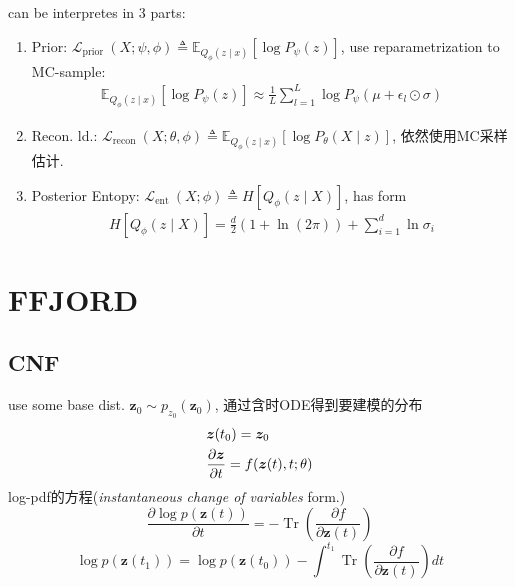 \documentclass{article}
\begin{document}
    can be interpretes in 3 parts:
    \begin{enumerate}
        \item Prior: $\mathcal{L}_{\text {prior }}(X ; \psi, \phi) \triangleq \mathbb{E}_{Q_{\phi}(z \mid x)}\left[\log P_{\psi}(z)\right]$, use reparametrization to MC-sample: \begin{align}
            \mathbb{E}_{Q_{\phi}(z \mid x)}\left[\log P_{\psi}(z)\right] \approx \frac{1}{L} \sum_{l=1}^{L} \log P_{\psi}\left(\mu+\epsilon_{l} \odot \sigma\right)
        \end{align}
        \item Recon. ld.: $\mathcal{L}_{\text {recon }}(X ; \theta, \phi) \triangleq \mathbb{E}_{Q_{\phi}(z \mid x)}\left[\log P_{\theta}(X \mid z)\right]$, 依然使用MC采样估计.
        \item Posterior Entopy: $\mathcal{L}_{\text {ent }}(X ; \phi) \triangleq H\left[Q_{\phi}(z \mid X)\right]$, has form \begin{align}
            H\left[Q_{\phi}(z \mid X)\right]=\frac{d}{2}(1+\ln (2 \pi))+\sum_{i=1}^{d} \ln \sigma_{i}
        \end{align}
    \end{enumerate}

\section{FFJORD}
\subsection{CNF}

    use some base dist. $\mathbf{z}_{0} \sim p_{z_{0}}\left(\mathbf{z}_{0}\right)$, 通过含时ODE得到要建模的分布
    \begin{align}
        &\boldsymbol{z}(t_0) = \boldsymbol{z}_0\\
        &\frac{\partial \boldsymbol{z}}{\partial t} = f(\boldsymbol{z}(t), t;\theta)
    \end{align}
    log-pdf的方程(\textit{instantaneous change of variables} form.)
    \begin{equation}
        \frac{\partial \log p(\mathbf{z}(t))}{\partial t}=-\operatorname{Tr}\left(\frac{\partial f}{\partial \mathbf{z}(t)}\right)
    \end{equation}
    \begin{equation}
        \log p\left(\mathbf{z}\left(t_{1}\right)\right)=\log p\left(\mathbf{z}\left(t_{0}\right)\right)-\int^{t_{1}} \operatorname{Tr}\left(\frac{\partial f}{\partial \mathbf{z}(t)}\right) d t
    \end{equation}
\end{document}

